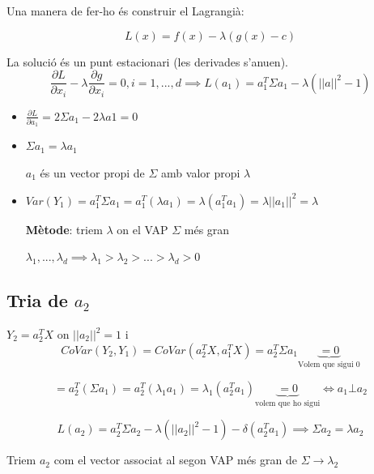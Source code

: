 \documentclass[a4paper]{article}
\begin{document}
Una manera de fer-ho és construir el Lagrangià:

$$  L(x) = f(x) - \lambda(g(x) - c)  $$

La solució és un punt estacionari (les derivades s'anu\lgem en).
$$  \frac{\partial L}{\partial x_i} - \lambda \frac{\partial g}{\partial x_i} = 0, i = 1, ..., d \implies L(a_1) = a_1^T\Sigma a_1 - \lambda(||a||^2 - 1)  $$

\begin{itemize}
	\item $\frac{\partial L}{\partial a_1} = 2\Sigma a_1 - 2\lambda a1 = 0$
	\item $\Sigma a_1 = \lambda a_1$
	
	$a_1$ és un vector propi de $\Sigma$ amb valor propi $\lambda$
	\item $Var(Y_1) = a_1^T\Sigma a_1=a_1^T(\lambda a_1) = \lambda(a_1^T a_1) = \lambda ||a_1||^2 = \lambda$
	
	\textbf{Mètode}: triem $\lambda$ on el VAP $\Sigma$ més gran
	
	$\lambda_1, ..., \lambda_d \implies \lambda_1 > \lambda_2 > ... > \lambda_d > 0$
\end{itemize}

\subsection{Tria de $a_2$}

$Y_2 = a_2^TX$ on $||a_2||^2 = 1$ i $$ CoVar(Y_2, Y_1) = CoVar(a_2^TX, a_1^TX) = a_2^T\Sigma a_1 \underbrace{= 0}_\text{Volem que sigui 0} $$ 

$$  = a_2^T(\Sigma a_1) = a_2^T(\lambda_1 a_1) = \lambda_1 (a_2^Ta_1) \underbrace{= 0}_\text{volem que ho sigui} \Leftrightarrow a_1 \bot a_2  $$

$$  L(a_2) = a_2^T\Sigma a_2 - \lambda(||a_2||^2 - 1) - \delta(a_2^Ta_1) \implies \Sigma a_2 = \lambda a_2  $$

Triem $a_2$ com el vector associat al segon VAP més gran de $\Sigma \rightarrow \lambda_2$
\end{document}
